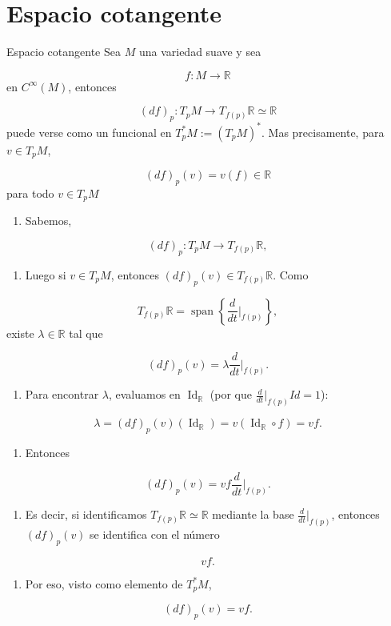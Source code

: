 \section{Espacio cotangente}
\begin{bookproposition}{Espacio cotangente}
Sea $M$ una variedad suave y sea

\[
f:M \to \mathbb R
\]
en $C^{\infty}(M)$, entonces

\[
(df)_p:T_pM \to T_{f(p)}\mathbb R \simeq \mathbb R
\]
puede verse como un funcional en $T_p^*M:=(T_{p}M)^{*}$. Mas precisamente, para $v \in T_pM$,

\[
(df)_p(v)=v(f)\in \mathbb{R}
\]
para todo $v\in T_{p}M$

\end{bookproposition}
\begin{bookproof}{}
\begin{enumerate}
\item Sabemos,
\end{enumerate}
\[
(df)_p:T_pM\to T_{f(p)}\mathbb R,
\]
\begin{enumerate}[start=2]
\item Luego si $v\in T_pM$, entonces $(df)_p(v)\in T_{f(p)}\mathbb R$. Como
\end{enumerate}
\[
T_{f(p)}\mathbb R=\operatorname{span}\left\{\frac{d}{dt}\bigg|_{f(p)}\right\},
\]
existe $\lambda\in\mathbb R$ tal que

\[
(df)_p(v)=\lambda\frac{d}{dt}\bigg|_{f(p)}.
\]
\begin{enumerate}[start=3]
\item Para encontrar $\lambda$, evaluamos en $\operatorname{Id}_{\mathbb R}$ (por que $\frac{d}{dt}\bigg|_{f(p)}Id=1$):
\end{enumerate}
\[
\lambda=(df)_p(v)(\operatorname{Id}_{\mathbb R})=v(\operatorname{Id}_{\mathbb R}\circ f)=vf.
\]
\begin{enumerate}[start=4]
\item Entonces
\end{enumerate}
\[
(df)_p(v)=vf\frac{d}{dt}\bigg|_{f(p)}.
\]
\begin{enumerate}[start=5]
\item Es decir, si identificamos $T_{f(p)}\mathbb R\simeq\mathbb R$ mediante la base $\frac{d}{dt}\big|_{f(p)}$, entonces $(df)_p(v)$ se identifica con el número
\end{enumerate}
\[
vf.
\]
\begin{enumerate}[start=6]
\item Por eso, visto como elemento de $T_p^*M$,
\end{enumerate}
\[
(df)_p(v)=vf.
\]
\bookqed
\end{bookproof}
